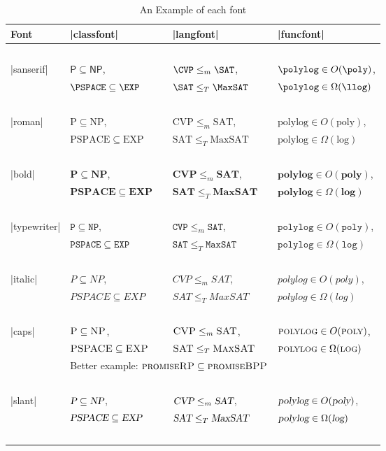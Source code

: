 \documentclass{ltxdoc}
\begin{document}
\begin{table}[h]
  \centering
  \caption{An Example of each font}\label{table:Examples}
\begin{tabular}{lp{3cm}p{4cm}p{3.5cm}}
Font & |classfont| & |langfont| & |funcfont| \\
\hline %
\hline %
~\\
|sanserif| & $\mathsf{P} \subseteq \mathsf{NP}$, & $\CVP \leq_m \SAT$, & $\polylog \in O(\poly)$,\\
~ & $\PSPACE \subseteq \EXP$ & $\SAT \leq_T \MaxSAT$ & $\polylog \in \Omega(\llog)$ \\
~\\
|roman| & $\mathrm{P} \subseteq \mathrm{NP}$, & $\mathrm{CVP} \leq_m \mathrm{SAT}$, & $\mathrm{polylog} \in O(\mathrm{poly})$,\\
~ & $\mathrm{PSPACE} \subseteq \mathrm{EXP}$ & $\mathrm{SAT} \leq_T \mathrm{MaxSAT}$ & $\mathrm{polylog} \in \Omega(\mathrm{log})$ \\
~\\
|bold| & $\mathbf{P} \subseteq \mathbf{NP}$, & $\mathbf{CVP} \leq_m \mathbf{SAT}$, & $\mathbf{polylog} \in O(\mathbf{poly})$,\\
~ & $\mathbf{PSPACE} \subseteq \mathbf{EXP}$ & $\mathbf{SAT} \leq_T \mathbf{MaxSAT}$ & $\mathbf{polylog} \in \Omega(\mathbf{log})$ \\
~\\
|typewriter| & $\mathtt{P} \subseteq \mathtt{NP}$, & $\mathtt{CVP} \leq_m \mathtt{SAT}$, & $\mathtt{polylog} \in O(\mathtt{poly})$,\\
~ & $\mathtt{PSPACE} \subseteq \mathtt{EXP}$ & $\mathtt{SAT} \leq_T \mathtt{MaxSAT}$ & $\mathtt{polylog} \in \Omega(\mathtt{log})$ \\
~\\
|italic| & $\mathit{P} \subseteq \mathit{NP}$, & $\mathit{CVP} \leq_m \mathit{SAT}$, & $\mathit{polylog} \in O(\mathit{poly})$,\\
~ & $\mathit{PSPACE} \subseteq \mathit{EXP}$ & $\mathit{SAT} \leq_T \mathit{MaxSAT}$ & $\mathit{polylog} \in \Omega(\mathit{log})$ \\
~\\
|caps| & $\textsc{P} \subseteq \textsc{NP}$, & $\textsc{CVP} \leq_m \textsc{SAT}$, & $\textsc{polylog} \in O(\textsc{poly})$,\\
~ & $\textsc{PSPACE} \subseteq \textsc{EXP}$ & $\textsc{SAT} \leq_T \textsc{MaxSAT}$ & $\textsc{polylog} \in \Omega(\textsc{log})$ \\
~ & \multicolumn{2}{l}{Better example: $\textsc{promiseRP} \subseteq \textsc{promiseBPP}$}\\
~\\
|slant| & $\textsl{P} \subseteq \textsl{NP}$, & $\textsl{CVP} \leq_m \textsl{SAT}$, & $\textsl{polylog} \in O(\textsl{poly})$,\\
~ & $\textsl{PSPACE} \subseteq \textsl{EXP}$ & $\textsl{SAT} \leq_T \textsl{MaxSAT}$ & $\textsl{polylog} \in \Omega(\textsl{log})$ \\
~\\
\end{tabular}
\end{table}
\end{document}
